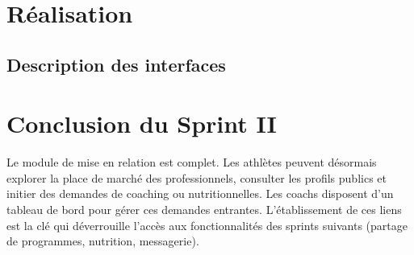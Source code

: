 \section{Réalisation}

\subsection{Description des interfaces}

\section*{Conclusion du Sprint II}
\mtcaddsection
{}
Le module de mise en relation est complet. Les athlètes peuvent désormais explorer la place de marché des professionnels, consulter les profils publics et initier des demandes de coaching ou nutritionnelles. Les coachs disposent d'un tableau de bord pour gérer ces demandes entrantes. L'établissement de ces liens est la clé qui déverrouille l'accès aux fonctionnalités des sprints suivants (partage de programmes, nutrition, messagerie).
